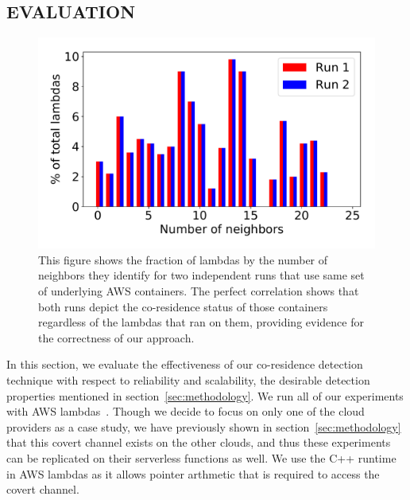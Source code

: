 \subsection{EVALUATION}
\label{sec:eval}

\begin{figure}[!t]
  \includegraphics[width=.99\linewidth]{fig/correlation.pdf}
  \caption{This figure shows the fraction of lambdas by the number of neighbors 
  they identify for two independent runs that use same set of underlying AWS
  containers. The perfect correlation shows that both runs depict the co-residence 
  status of those containers regardless of the lambdas that ran on them, providing
  evidence for the correctness of our approach.
\label{fig:correlation}}
\end{figure}

In this section, we evaluate the effectiveness of our co-residence detection
technique with respect to reliability and scalability, the desirable detection
properties mentioned in section~\ref{sec:methodology}.  We run all of our
experiments with AWS lambdas~\cite{awscloud}. Though we decide to focus on only
one of the cloud providers as a case study, we have previously shown in
section~\ref{sec:methodology} that this covert channel exists on the other
clouds, and thus these experiments can be replicated on their serverless
functions as well. We use the C++ runtime in AWS lambdas as it allows pointer
arthmetic that is required to access the covert channel.

